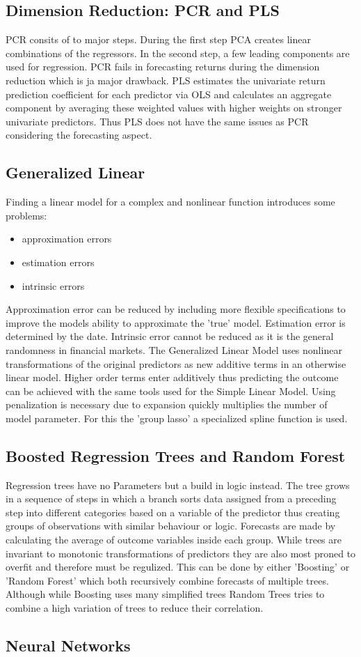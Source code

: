 \documentclass{article}
\begin{document}
\subsection{Dimension Reduction: PCR and PLS}
	PCR consits of to major steps. During the first step PCA creates linear combinations
	of the regressors. In the second step, a few leading components are used for regression.
	PCR fails in forecasting returns during the dimension reduction which is ja major drawback.
	\newline
	PLS estimates the univariate return prediction coefficient for each predictor via OLS
	and calculates an aggregate component by averaging these weighted values
	with higher weights on stronger univariate predictors. Thus PLS does not have the
	same issues as PCR considering the forecasting aspect.

\subsection{Generalized Linear}
	Finding a linear model for a complex and nonlinear function introduces some problems:
	\begin{itemize}
		\item approximation errors
		\item estimation errors
		\item intrinsic errors
	\end{itemize}
	Approximation error can be reduced by including more flexible specifications to improve the
	models ability to approximate the 'true' model.
	Estimation error is determined by the date.
	Intrinsic error cannot be reduced as it is the general randomness in financial markets.
	The Generalized Linear Model uses nonlinear transformations of the original predictors as new
	additive terms in an otherwise linear model.
	Higher order terms enter additively thus predicting the outcome can be achieved with the same
	tools used for the Simple Linear Model.
	Using penalization is necessary due to expansion quickly multiplies the number of model parameter.
	For this the 'group lasso' a specialized spline function is used.

\subsection{Boosted Regression Trees and Random Forest}
	Regression trees have no Parameters but a build in logic instead.
	The tree grows in a sequence of steps in which a branch sorts data assigned from
	a preceding step into different categories based on a variable of the predictor
	thus creating groups of observations with similar behaviour or logic.
	Forecasts are made by calculating the average of outcome variables inside each group.
	While trees are invariant to monotonic transformations of predictors they are
	also most proned to overfit and therefore must be regulized. This can be done
	by either 'Boosting' or 'Random Forest' which both recursively combine
	forecasts of multiple trees. Although while Boosting uses many simplified trees
	Random Trees tries to combine a high variation of trees to reduce their correlation.

\subsection{Neural Networks}
\end{document}
